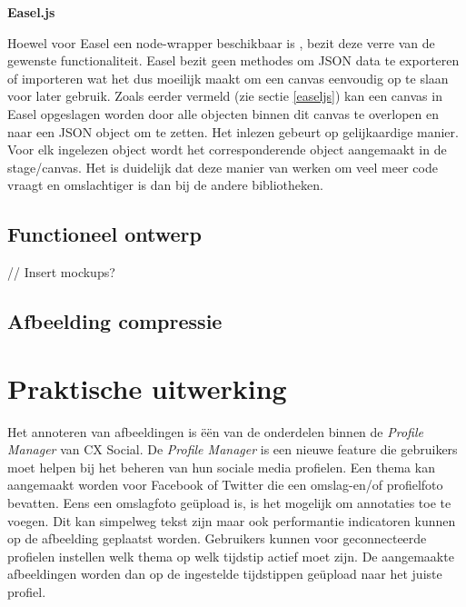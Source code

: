 \textbf{Easel.js} 

Hoewel voor Easel een node-wrapper beschikbaar is %
, bezit deze verre van de gewenste functionaliteit. Easel bezit geen methodes om JSON data te exporteren of importeren wat het dus moeilijk maakt om een canvas eenvoudig op te slaan voor later gebruik. Zoals eerder vermeld (zie sectie \ref{easeljs}) kan een canvas in Easel opgeslagen worden door alle objecten binnen dit canvas te overlopen en naar een JSON object om te zetten. Het inlezen gebeurt op gelijkaardige manier. Voor elk ingelezen object wordt het corresponderende object aangemaakt in de stage/canvas. Het is duidelijk dat deze manier van werken om veel meer code vraagt en omslachtiger is dan bij de andere bibliotheken.  


\newpage
\section{Functioneel ontwerp}
// Insert mockups?
\newpage
\section{Afbeelding compressie}

\chapter{Praktische uitwerking}
Het annoteren van afbeeldingen is \"{e}\"{e}n van de onderdelen binnen de \textit{Profile Manager} van CX Social. De \textit{Profile Manager} is een nieuwe feature die gebruikers moet helpen bij het beheren van hun sociale media profielen. Een thema kan aangemaakt worden voor Facebook of Twitter die een omslag-en/of profielfoto bevatten. Eens een omslagfoto ge\"{u}pload is, is het mogelijk om annotaties toe te voegen. Dit kan simpelweg tekst zijn maar ook performantie indicatoren kunnen op de afbeelding geplaatst worden. Gebruikers kunnen voor geconnecteerde profielen instellen welk thema op welk tijdstip actief moet zijn. De aangemaakte afbeeldingen worden dan op de ingestelde tijdstippen ge\"{u}pload naar het juiste profiel. 


